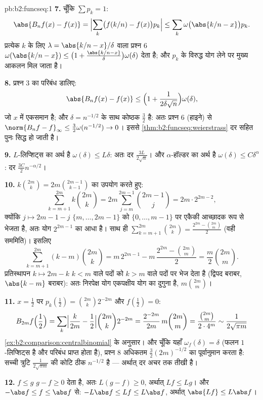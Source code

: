 \begin{solution}{pb:b2:funcseq:1}
\textbf{7.} चूँकि $\sum p_k = 1$:
\[
\abs{B_nf(x) - f(x)}
= \Bigl|\sum_k\bigl(f(k/n) - f(x)\bigr)p_k\Bigr|
\leq \sum_k\omega\bigl(\abs{k/n - x}\bigr)p_k .
\]
प्रत्येक $k$ के लिए $\lambda = \abs{k/n - x}/\delta$ वाला प्रश्न 6 $\omega(\abs{k/n-x}) \leq \bigl(1 +
\frac{\abs{k/n-x}}\delta\bigr)\omega(\delta)$ देता है; और $p_k$ के विरुद्ध योग
लेने पर मुख्य आकलन मिल जाता है।

\textbf{8.} प्रश्न 3 का परिबंध डालिए:
\[
\abs{B_nf(x) - f(x)} \leq \Bigl(1 +
\frac{1}{2\delta\sqrt n}\Bigr)\omega(\delta),
\]
जो $x$ में एकसमान है; और $\delta = n^{-1/2}$ के साथ कोष्ठक $\frac32$ है: अतः प्रश्न 6 (हाइने)
से $\norm{B_nf - f}_\infty \leq
\frac32\omega(n^{-1/2}) \to 0$। इससे \cref{thm:b2:funcseq:weierstrass} दर सहित पुनः सिद्ध हो जाती है।

\textbf{9.} $L$-लिप्शिट्स का अर्थ है $\omega(\delta) \leq L\delta$: अतः दर $\frac{3L}{2\sqrt n}$। और $\alpha$-हॉल्डर का
अर्थ है $\omega(\delta) \leq C\delta^\alpha$: दर $\frac{3C}{2}
n^{-\alpha/2}$।

\textbf{10.} $k\binom{2m}k = 2m\binom{2m-1}{k-1}$ का उपयोग करते हुए:
\[
\sum_{k=m+1}^{2m}k\binom{2m}k
= 2m\sum_{j=m}^{2m-1}\binom{2m-1}{j}
= 2m\cdot 2^{2m-2},
\]
क्योंकि $j \mapsto 2m-1-j$ $\{m,\dots,2m-1\}$ को $\{0,\dots,m-1\}$ पर एकैकी आच्छादक रूप से भेजता है, अतः योग $2^{2m-1}$ का
आधा है। साथ ही $\sum_{k=m+1}^{2m}\binom{2m}k = \frac{2^{2m} -
\binom{2m}m}{2}$ (वही सममिति)। इसलिए
\[
\sum_{k=m+1}^{2m}(k-m)\binom{2m}k
= m\,2^{2m-1} - m\,\frac{2^{2m} - \binom{2m}m}{2}
= \frac m2\binom{2m}m .
\]
प्रतिस्थापन $k \mapsto 2m-k$ $k < m$ वाले पदों को $k > m$ वाले पदों पर भेज देता है (द्विपद
बराबर, $\abs{k-m}$ बराबर): अतः निरपेक्ष योग एकपक्षीय योग का दुगुना है, $m\binom{2m}m$।

\textbf{11.} $x = \frac12$ पर $p_k(\tfrac12) =
\binom{2m}k2^{-2m}$ और $f(\tfrac12) = 0$:
\[
B_{2m}f\Bigl(\frac12\Bigr)
= \sum_k\Bigl|\frac{k}{2m} - \frac12\Bigr|
\binom{2m}k 2^{-2m}
= \frac{2^{-2m}}{2m}\,m\binom{2m}m
= \frac{\binom{2m}m}{2\cdot4^m}
\sim \frac{1}{2\sqrt{\pi m}}
\]
\cref{ex:b2:comparison:centralbinomial} के अनुसार। और चूँकि यहाँ $\omega_f
(\delta) = \delta$ (फलन $1$-लिप्शिट्स है और परिबंध प्राप्त
होता है), प्रश्न 8 अधिकतम $\frac32(2m)^{-1/2}$ का पूर्वानुमान करता है: सच्ची त्रुटि $\frac{1}{2\sqrt{\pi m}}$
की कोटि ठीक $n^{-1/2}$ है --- अर्थात् दर अचर तक तीखी है।

\textbf{12.} $f \leq g$ $g - f \geq 0$ देता है, अतः $L(g-f) \geq
0$, अर्थात् $Lf \leq Lg$। और $-\abs f \leq f \leq \abs f$ से: $-L\abs f \leq Lf \leq L\abs f$,
अर्थात् $\abs{Lf} \leq
L\abs f$।


\end{solution}
